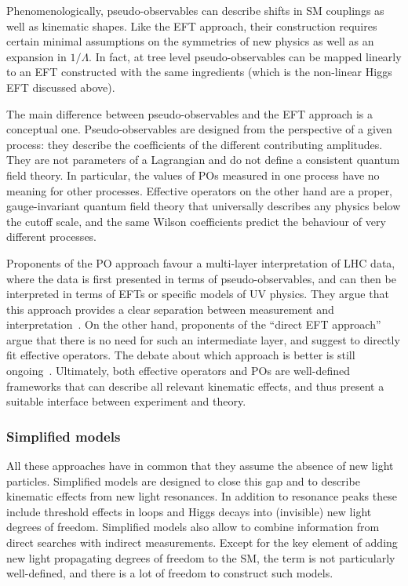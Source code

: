 Phenomenologically, pseudo-observables can describe shifts in SM
couplings as well as kinematic shapes. Like the EFT approach, their
construction requires certain minimal assumptions on the symmetries of
new physics as well as an expansion in $1/\Lambda$. In fact, at tree
level pseudo-observables can be mapped linearly to an EFT constructed
with the same ingredients (which is the non-linear Higgs EFT discussed
above).

The main difference between pseudo-observables and the EFT approach is
a conceptual one. Pseudo-observables are designed from the perspective
of a given process: they describe the coefficients of the different
contributing amplitudes. They are not parameters of a Lagrangian and
do not define a consistent quantum field theory. In particular, the
values of POs measured in one process have no meaning for other
processes. Effective operators on the other hand are a proper,
gauge-invariant quantum field theory that universally describes any
physics below the cutoff scale, and the same Wilson coefficients
predict the behaviour of very different processes.

Proponents of the PO approach favour a multi-layer interpretation of
LHC data, where the data is first presented in terms of
pseudo-observables, and can then be interpreted in terms of EFTs or
specific models of UV physics. They argue that this approach provides
a clear separation between measurement and
interpretation~\cite{deFlorian:2016spz}. On the other hand, proponents
of the ``direct EFT approach'' argue that there is no need for such an
intermediate layer, and suggest to directly fit effective
operators. The debate about which approach is better is still
ongoing~\cite{deFlorian:2016spz}. Ultimately, both effective operators
and POs are well-defined frameworks that can describe all relevant
kinematic effects, and thus present a suitable interface between
experiment and theory.



\subsubsection{Simplified models}

All these approaches have in common that they assume the absence of new
light particles. Simplified models are designed to close this gap and
to describe kinematic effects from new light resonances. In addition
to resonance peaks these include threshold effects in loops and Higgs
decays into (invisible) new light degrees of freedom. Simplified
models also allow to combine information from direct searches with
indirect measurements. Except for the key element of adding new light
propagating degrees of freedom to the SM, the term is not particularly
well-defined, and there is a lot of freedom to construct such models.

